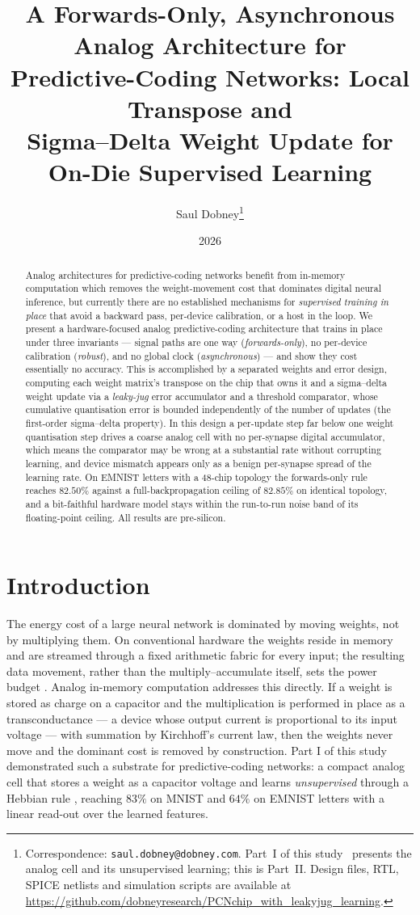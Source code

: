 \documentclass[11pt]{article}
\title{\bfseries A Forwards-Only, Asynchronous Analog Architecture for\\
Predictive-Coding Networks: Local Transpose and\\
Sigma--Delta Weight Update for On-Die Supervised Learning}
\author{Saul Dobney\thanks{Correspondence: \texttt{saul.dobney@dobney.com}.
Part~I of this study~\cite{dobney2026analog} presents the analog cell and its unsupervised
learning; this is Part~II. Design files, RTL, SPICE netlists and simulation scripts are available at
\url{https://github.com/dobneyresearch/PCNchip_with_leakyjug_learning}.}}
\date{2026}
\begin{document}
\maketitle

\begin{abstract}
Analog architectures for predictive-coding networks benefit from
in-memory computation which removes the weight-movement cost that
dominates digital neural inference, but currently there are no
established mechanisms for \emph{supervised training in place} that
avoid a backward pass, per-device calibration, or a host in the loop. We
present a hardware-focused analog predictive-coding architecture that
trains in place under three invariants --- signal paths are one way
(\emph{forwards-only}), no per-device calibration (\emph{robust}), and
no global clock (\emph{asynchronous}) --- and show they cost essentially
no accuracy. This is accomplished by a separated weights and error
design, computing each weight matrix's transpose on the chip that owns
it and a sigma--delta weight update via a \emph{leaky-jug} error
accumulator and a threshold comparator, whose cumulative quantisation
error is bounded independently of the number of updates (the first-order
sigma--delta property). In this design a per-update step far below one
weight quantisation step drives a coarse analog cell with no per-synapse
digital accumulator, which means the comparator may be wrong at a
substantial rate without corrupting learning, and device mismatch
appears only as a benign per-synapse spread of the learning rate. On
EMNIST letters with a 48-chip topology the forwards-only rule reaches
\(82.50\%\) against a full-backpropagation ceiling of \(82.85\%\) on
identical topology, and a bit-faithful hardware model stays within the
run-to-run noise band of its floating-point ceiling. All results are
pre-silicon.
\end{abstract}

\hypertarget{sec:intro}{%
\section{Introduction}\label{sec:intro}}

The energy cost of a large neural network is dominated by moving
weights, not by multiplying them. On conventional hardware the weights
reside in memory and are streamed through a fixed arithmetic fabric for
every input; the resulting data movement, rather than the
multiply--accumulate itself, sets the power budget
\cite{horowitz2014computing, mead1989analog, ambrogio2018equivalent}.
Analog in-memory computation addresses this directly. If a weight is
stored as charge on a capacitor and the multiplication is performed in
place as a transconductance --- a device whose output current is
proportional to its input voltage --- with summation by Kirchhoff's
current law, then the weights never move and the dominant cost is
removed by construction. Part I of this study \cite{dobney2026analog}
demonstrated such a substrate for predictive-coding networks: a compact
analog cell that stores a weight as a capacitor voltage and learns
\emph{unsupervised} through a Hebbian rule \cite{Sanger1989}, reaching
\(83\%\) on MNIST and \(64\%\) on EMNIST letters with a linear read-out
over the learned features.
\end{document}
